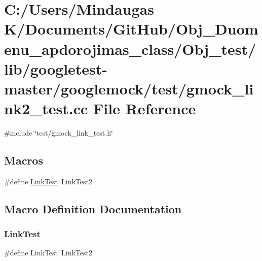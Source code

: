 \hypertarget{_obj__test_2lib_2googletest-master_2googlemock_2test_2gmock__link2__test_8cc}{}\section{C\+:/\+Users/\+Mindaugas K/\+Documents/\+Git\+Hub/\+Obj\+\_\+\+Duomenu\+\_\+apdorojimas\+\_\+class/\+Obj\+\_\+test/lib/googletest-\/master/googlemock/test/gmock\+\_\+link2\+\_\+test.cc File Reference}
\label{_obj__test_2lib_2googletest-master_2googlemock_2test_2gmock__link2__test_8cc}
{\ttfamily \#include \char`\"{}test/gmock\+\_\+link\+\_\+test.\+h\char`\"{}}\newline
\subsection*{Macros}
\begin{DoxyCompactItemize}
\item 
\#define \mbox{\hyperlink{_obj__test_2lib_2googletest-master_2googlemock_2test_2gmock__link2__test_8cc_afb3d3e7fd53242710a55460595d750bb}{Link\+Test}}~Link\+Test2
\end{DoxyCompactItemize}


\subsection{Macro Definition Documentation}
\mbox{\label{_obj__test_2lib_2googletest-master_2googlemock_2test_2gmock__link2__test_8cc_afb3d3e7fd53242710a55460595d750bb}} 
\subsubsection{\texorpdfstring{LinkTest}{LinkTest}}
{\footnotesize\ttfamily \#define Link\+Test~Link\+Test2}


